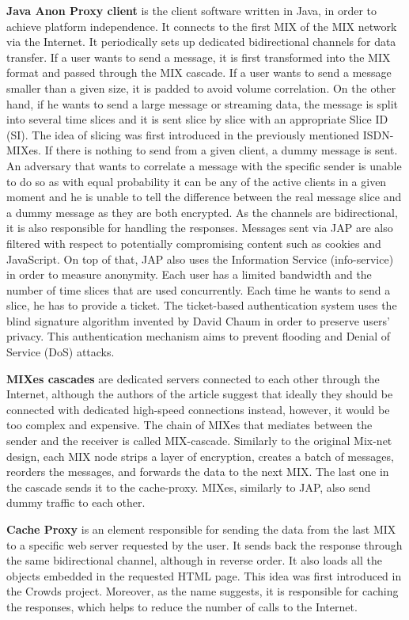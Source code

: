 \textbf{Java Anon Proxy client} is the client software written in Java, in order to achieve platform independence. It connects to the first MIX of the MIX network via the Internet. It periodically sets up dedicated bidirectional channels for data transfer. If a user wants to send a message, it is first transformed into the MIX format and passed through the MIX cascade. If a user wants to send a message smaller than a given size, it is padded to avoid volume correlation. On the other hand, if he wants to send a large message or streaming data, the message is split into several time slices and it is sent slice by slice with an appropriate Slice ID (SI). The idea of slicing was first introduced in the previously mentioned ISDN-MIXes. If there is nothing to send from a given client, a dummy message is sent. An adversary that wants to correlate a message with the specific sender is unable to do so as with equal probability it can be any of the active clients in a given moment and he is unable to tell the difference between the real message slice and a dummy message as they are both encrypted. As the channels are bidirectional, it is also responsible for handling the responses. Messages sent via JAP are also filtered with respect to potentially compromising content such as cookies and JavaScript. On top of that, JAP also uses the Information Service (info-service) in order to measure anonymity. Each user has a limited bandwidth and the number of time slices that are used concurrently. Each time he wants to send a slice, he has to provide a ticket. The ticket-based authentication system uses the blind signature algorithm invented by David Chaum \cite{blind-signatures} in order to preserve users' privacy. This authentication mechanism aims to prevent flooding and Denial of Service (DoS) attacks.

\textbf{MIXes cascades} are dedicated servers connected to each other through the Internet, although the authors of the article suggest that ideally they should be connected with dedicated high-speed connections instead, however, it would be too complex and expensive. The chain of MIXes that mediates between the sender and the receiver is called MIX-cascade. Similarly to the original Mix-net design, each MIX node strips a layer of encryption, creates a batch of messages, reorders the messages, and forwards the data to the next MIX. The last one in the cascade sends it to the cache-proxy. MIXes, similarly to JAP, also send dummy traffic to each other.

\textbf{Cache Proxy} is an element responsible for sending the data from the last MIX to a specific web server requested by the user. It sends back the response through the same bidirectional channel, although in reverse order. It also loads all the objects embedded in the requested HTML page. This idea was first introduced in the Crowds project. Moreover, as the name suggests, it is responsible for caching the responses, which helps to reduce the number of calls to the Internet.

